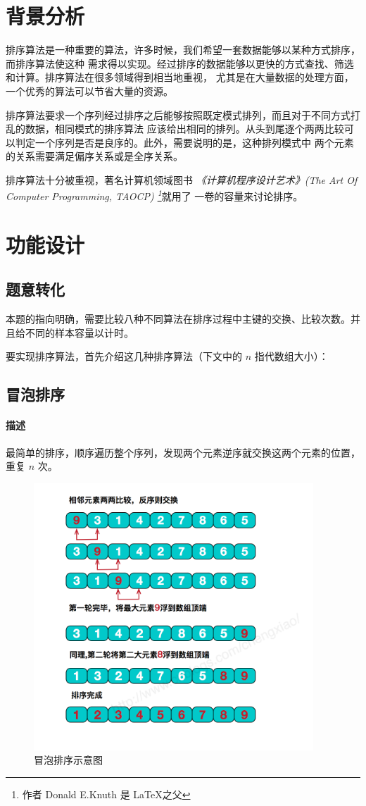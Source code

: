 
\chapter{背景分析}

排序算法是一种重要的算法，许多时候，我们希望一套数据能够以某种方式排序，而排序算法使这种%
需求得以实现。经过排序的数据能够以更快的方式查找、筛选和计算。排序算法在很多领域得到相当地重视，%
尤其是在大量数据的处理方面，一个优秀的算法可以节省大量的资源。%

排序算法要求一个序列经过排序之后能够按照既定模式排列，而且对于不同方式打乱的数据，相同模式的排序算法%
应该给出相同的排列。从头到尾逐个两两比较可以判定一个序列是否是良序的。此外，需要说明的是，这种排列模式中%
两个元素的关系需要满足偏序关系或是全序关系。

排序算法十分被重视，著名计算机领域图书%
\emph{《计算机程序设计艺术》(The Art Of Computer Programming, TAOCP) \footnote{作者 Donald E.Knuth 是 \LaTeX 之父}}就用了%
一卷的容量来讨论排序。


\chapter{功能设计}

\section{题意转化}
本题的指向明确，需要比较八种不同算法在排序过程中主键的交换、比较次数。并且给不同的样本容量以计时。

要实现排序算法，首先介绍这几种排序算法（下文中的 $n$ 指代数组大小）：

\section{冒泡排序}
\subsubsection{描述}

最简单的排序，顺序遍历整个序列，发现两个元素逆序就交换这两个元素的位置，重复 $n$ 次。

\begin{figure}[H]
    \centering
    \includegraphics[width=10.5cm]{src/bubble.png}
    \caption{冒泡排序示意图}
\end{figure}


